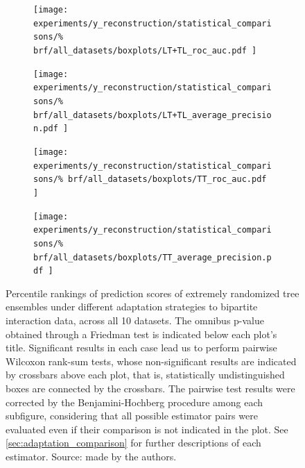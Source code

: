 \begin{figure}[tbh]
    \centering
    \begin{subfigure}{0.49\textwidth}
        \texttt{[image: 
            experiments/y\_reconstruction/statistical\_comparisons/\%
            brf/all\_datasets/boxplots/LT+TL\_roc\_auc.pdf
        ]}
    \end{subfigure}
    \begin{subfigure}{0.49\textwidth}
        \texttt{[image: 
            experiments/y\_reconstruction/statistical\_comparisons/\%
            brf/all\_datasets/boxplots/LT+TL\_average\_precision.pdf
        ]}
    \end{subfigure}

    \begin{subfigure}{0.49\textwidth}
        \texttt{[image: 
            experiments/y\_reconstruction/statistical\_comparisons/\%
            brf/all\_datasets/boxplots/TT\_roc\_auc.pdf
        ]}
    \end{subfigure}
    \begin{subfigure}{0.49\textwidth}
        \texttt{[image: 
            experiments/y\_reconstruction/statistical\_comparisons/\%
            brf/all\_datasets/boxplots/TT\_average\_precision.pdf
        ]}
    \end{subfigure}
    \caption{
        Percentile rankings of prediction scores of extremely randomized tree ensembles under different adaptation strategies to bipartite interaction data, across all 10 datasets.
        The omnibus p-value obtained through a Friedman test is indicated below each plot's title. Significant results in each case lead us to perform pairwise Wilcoxon rank-sum tests, whose non-significant results are indicated by crossbars above each plot, that is, statistically undistinguished boxes are connected by the crossbars. The pairwise test results were corrected by the Benjamini-Hochberg procedure among each subfigure, considering that all possible estimator pairs were evaluated even if their comparison is not indicated in the plot. See \autoref{sec:adaptation_comparison} for further descriptions of each estimator. Source: made by the authors.
    }
    \label{fig:brf_y_reconstruction}
\end{figure}


